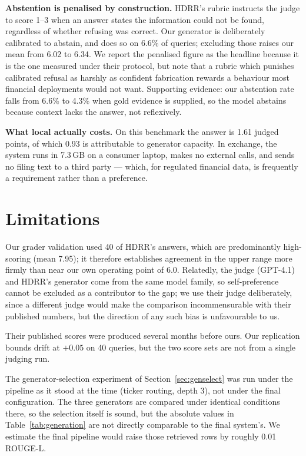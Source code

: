 \documentclass[conference]{IEEEtran}
\begin{document}
\textbf{Abstention is penalised by construction.} HDRR's rubric instructs the
judge to score 1--3 when an answer states the information could not be found,
regardless of whether refusing was correct. Our generator is deliberately
calibrated to abstain, and does so on 6.6\% of queries; excluding those raises
our mean from 6.02 to 6.34. We report the penalised figure as the headline
because it is the one measured under their protocol, but note that a rubric
which punishes calibrated refusal as harshly as confident fabrication rewards a
behaviour most financial deployments would not want. Supporting evidence: our
abstention rate falls from 6.6\% to 4.3\% when gold evidence is supplied, so
the model abstains because context lacks the answer, not reflexively.

\textbf{What local actually costs.} On this benchmark the answer is 1.61 judged
points, of which 0.93 is attributable to generator capacity. In exchange, the
system runs in 7.3\,GB on a consumer laptop, makes no external calls, and sends
no filing text to a third party --- which, for regulated financial data, is
frequently a requirement rather than a preference.

\section{Limitations}
\label{sec:limits}
Our grader validation used 40 of HDRR's answers, which are predominantly
high-scoring (mean 7.95); it therefore establishes agreement in the upper range
more firmly than near our own operating point of 6.0. Relatedly, the judge
(GPT-4.1) and HDRR's generator come from the same model family, so
self-preference cannot be excluded as a contributor to the gap; we use their
judge deliberately, since a different judge would make the comparison
incommensurable with their published numbers, but the direction of any such
bias is unfavourable to us.

Their published scores were produced several months before ours. Our
replication bounds drift at $+0.05$ on 40 queries, but the two score sets are
not from a single judging run.

The generator-selection experiment of Section~\ref{sec:genselect} was run
under the pipeline as it stood at the time (ticker routing, depth 3), not
under the final configuration. The three generators are compared under
identical conditions there, so the selection itself is sound, but the
absolute values in Table~\ref{tab:generation} are not directly comparable to
the final system's. We estimate the final pipeline would raise those
retrieved rows by roughly 0.01 ROUGE-L.
\end{document}
